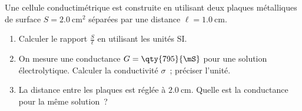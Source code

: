 Une cellule conductimétrique est construite en utilisant deux plaques
métalliques de surface $S=\qty{2,0}{\square\cm}$ séparées par une distance
$\ell=\qty{1,0}{\cm}$.
\begin{enumerate}
    \item Calculer le rapport $\frac{S}{\ell}$ en utilisant les unités SI.
    \item On mesure une conductance $G=\qty{795}{\mS}$ pour une solution
          électrolytique. Calculer la conductivité $\sigma$~; préciser l'unité.
    \item La distance entre les plaques est réglée à $\qty{2,0}{\cm}$. Quelle
          est la conductance pour la même solution~?
\end{enumerate}

